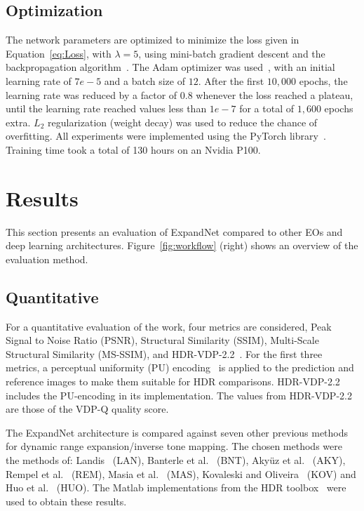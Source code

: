 \documentclass{egpubl}
\begin{document}
\subsection{\textbf{Optimization}}

The network parameters are optimized to minimize the loss given in
Equation~\ref{eq:Loss}, with $\lambda=5$, using mini-batch gradient descent and
the backpropagation algorithm~\cite{rumelhart1986learning}. The Adam optimizer
was used~\cite{kingma2014adam}, with an initial learning rate of $7e-5$ and a
batch size of $12$. After the first $10,000$ epochs, the learning rate was
reduced by a factor of $0.8$ whenever the loss reached a plateau, until the
learning rate reached values less than $1e-7$ for a total of $1,600$ epochs
extra. $L_2$ regularization (weight decay) was used to reduce the chance of
overfitting. All experiments were implemented using the PyTorch
library~\cite{pytorch}. Training time took a total of 130 hours on an Nvidia
P100.


\section{\textbf{Results}}
\label{sec:results}

This section presents an evaluation of ExpandNet compared to other EOs and deep
learning architectures. Figure~\ref{fig:workflow} (right) shows an overview of
the evaluation method.

\subsection{\textbf{Quantitative}}

For a quantitative evaluation of the work, four metrics are considered, Peak
Signal to Noise Ratio (PSNR), Structural Similarity (SSIM), Multi-Scale
Structural Similarity (MS-SSIM), and  HDR-VDP-2.2~\cite{narwaria2015hdrvdp}.
For the first three metrics, a perceptual uniformity (PU)
encoding~\cite{aydin2008} is applied to the prediction and reference images to
make them suitable for HDR comparisons. HDR-VDP-2.2 includes the PU-encoding in
its implementation. The values from HDR-VDP-2.2 are those of the VDP-Q quality
score.

The ExpandNet architecture is compared against seven other previous methods for
dynamic range expansion/inverse tone mapping. The chosen methods were the
methods of: Landis~\cite{Landis02} (LAN), Banterle et
al.~\cite{banterle06inverse} (BNT), Aky\"{u}z et al.~\cite{akyuz06} (AKY),
Rempel et al.~\cite{rempel06ldr2hdr} (REM),  Masia et al.~\cite{masia09}
(MAS), Kovaleski and Oliveira~\cite{Kovaleski+2014} (KOV) and Huo et
al.~\cite{Huo+2014} (HUO). The Matlab implementations from the HDR
toolbox~\cite{banterle2011hdrbook} were used to obtain these results.
\end{document}
